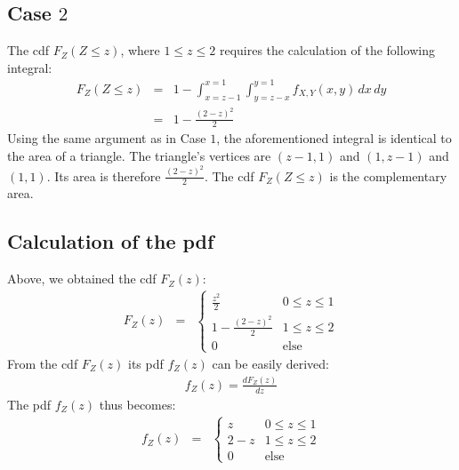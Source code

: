 \documentclass[12pt]{article}
\theoremstyle{definition}
\theoremstyle{remark}
\begin{document}
\subsection*{Case $2$}
The cdf $F_Z(Z\le z)$, where $1\le z \le 2$ requires 
the calculation of the following integral:
\begin{eqnarray}
	\displaystyle F_Z(Z \le z) &= & 1 - \int_{x=z-1}^{x=1} \int_{y=z-x}^{y=1} f_{X,Y}(x,y)\,dx\,dy \nonumber \\
	      & =& 1-\frac{(2-z)^2}{2} \nonumber
\end{eqnarray} 
Using the same argument as in Case $1$, the aforementioned integral is identical to the area of a triangle. The triangle's vertices are
$(z-1,1)$ and $(1,z-1)$ and $(1,1)$. Its area is therefore $\displaystyle \frac{(2-z)^2}{2}$. The cdf $F_Z(Z\le z)$ is the complementary area.

\subsection*{Calculation of the pdf}
Above, we obtained the cdf $F_Z(z)$: 
\begin{eqnarray}
     F_Z(z) &= & \begin{cases}
                     \frac{z^2}{2} & 0 \le z \le 1 \nonumber \\
		     1 - \frac{(2-z)^2}{2} & 1 \le z \le 2 \nonumber \\
		     0   & \text{else} \nonumber
	         \end{cases}
\end{eqnarray}
From the cdf $F_Z(z)$ its pdf $f_Z(z)$ can be easily derived: 
\begin{eqnarray}
    f_Z(z) = \frac{d F_Z(z)}{dz} \nonumber
\end{eqnarray}	
The pdf $f_Z(z)$ thus becomes:
\begin{eqnarray}
     f_Z(z) &= & \begin{cases}
                     z   & 0 \le z \le 1 \nonumber \\
                     2-z & 1 \le z \le 2 \nonumber \\
                     0   & \text{else} \nonumber
                 \end{cases}
\end{eqnarray}
\end{document}
